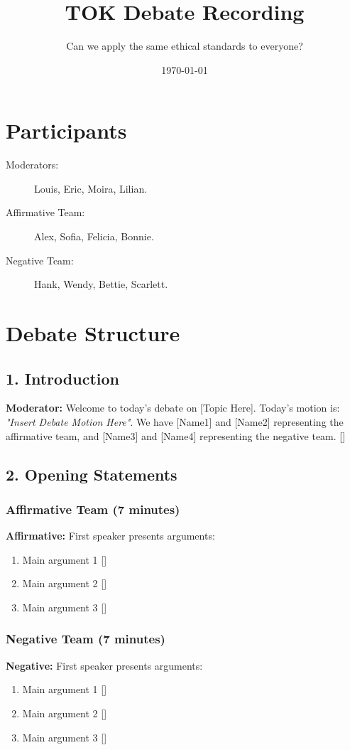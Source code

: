 \documentclass[12pt]{article}
\newcommand{\moderator}[1]{{\color{modcolor}\textbf{Moderator:} #1}}
\newcommand{\affirmative}[1]{{\color{affirmcolor}\textbf{Affirmative:} #1}}
\newcommand{\negative}[1]{{\color{negcolor}\textbf{Negative:} #1}}
\newcommand{\timestamp}{{\color{gray}\scriptsize[\currenttime]}}
\begin{document}
\title{\Huge \textbf{TOK Debate Recording}}
\author{Can we apply the same ethical standards to everyone?}
\date{\today}
\maketitle

\section*{Participants}
\begin{description}
    \item[Moderators:] Louis, Eric, Moira, Lilian.
    \item[Affirmative Team:] Alex, Sofia, Felicia, Bonnie.
    \item[Negative Team:] Hank, Wendy, Bettie, Scarlett.
\end{description}



\section*{Debate Structure}

\subsection*{1. Introduction}
\moderator{Welcome to today's debate on [Topic Here]. Today's motion is: \textit{"Insert Debate Motion Here"}. 
We have [Name1] and [Name2] representing the affirmative team, and [Name3] and [Name4] 
representing the negative team. \timestamp}

\subsection*{2. Opening Statements}

\subsubsection*{Affirmative Team (7 minutes)}
\affirmative{First speaker presents arguments:
\begin{enumerate}
    \item Main argument 1 \timestamp
    \item Main argument 2 \timestamp
    \item Main argument 3 \timestamp
\end{enumerate}}

\subsubsection*{Negative Team (7 minutes)}
\negative{First speaker presents arguments:
\begin{enumerate}
    \item Main argument 1 \timestamp
    \item Main argument 2 \timestamp
    \item Main argument 3 \timestamp
\end{enumerate}}
\end{document}
